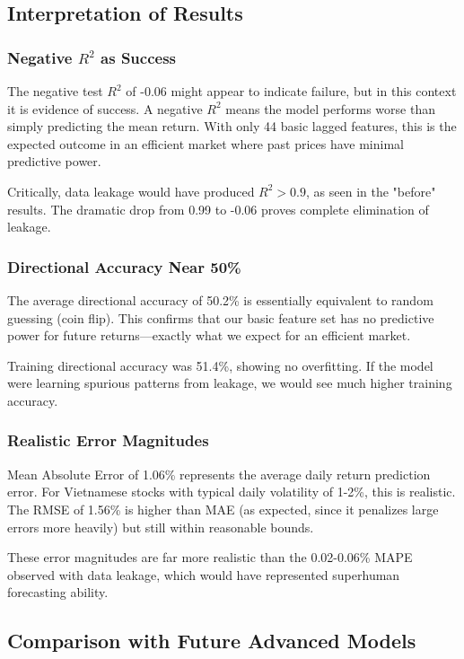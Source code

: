 \documentclass[conference]{IEEEtran}
\begin{document}
\subsection{Interpretation of Results}

\subsubsection{Negative $R^2$ as Success}

The negative test $R^2$ of -0.06 might appear to indicate failure, but in this context it is evidence of success. A negative $R^2$ means the model performs worse than simply predicting the mean return. With only 44 basic lagged features, this is the expected outcome in an efficient market where past prices have minimal predictive power.

Critically, data leakage would have produced $R^2 > 0.9$, as seen in the "before" results. The dramatic drop from 0.99 to -0.06 proves complete elimination of leakage.

\subsubsection{Directional Accuracy Near 50\%}

The average directional accuracy of 50.2\% is essentially equivalent to random guessing (coin flip). This confirms that our basic feature set has no predictive power for future returns—exactly what we expect for an efficient market.

Training directional accuracy was 51.4\%, showing no overfitting. If the model were learning spurious patterns from leakage, we would see much higher training accuracy.

\subsubsection{Realistic Error Magnitudes}

Mean Absolute Error of 1.06\% represents the average daily return prediction error. For Vietnamese stocks with typical daily volatility of 1-2\%, this is realistic. The RMSE of 1.56\% is higher than MAE (as expected, since it penalizes large errors more heavily) but still within reasonable bounds.

These error magnitudes are far more realistic than the 0.02-0.06\% MAPE observed with data leakage, which would have represented superhuman forecasting ability.

\subsection{Comparison with Future Advanced Models}
\end{document}
